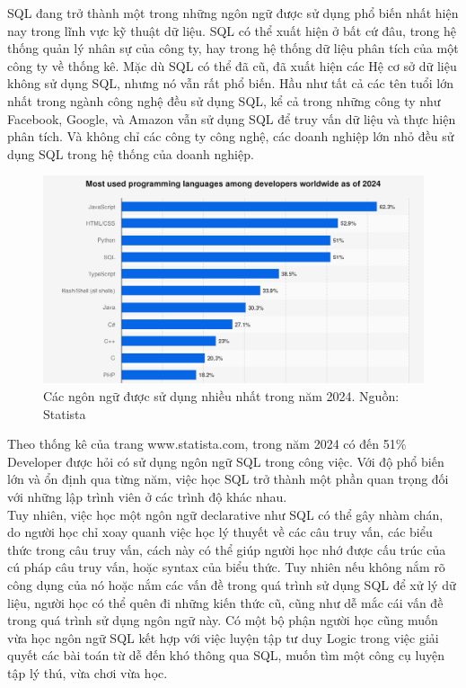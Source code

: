 \hspace*{0.5cm}SQL đang trở thành một trong những ngôn ngữ được sử dụng phổ biến nhất hiện nay trong lĩnh vực kỹ thuật dữ liệu. SQL có thể xuất hiện ở bất cứ đâu, trong hệ thống quản lý nhân sự của công ty, hay trong hệ thống dữ liệu phân tích của một công ty về thống kê. Mặc dù SQL có thể đã cũ, đã xuất hiện các Hệ cơ sở dữ liệu không sử dụng SQL, nhưng nó vẫn rất phổ biến. Hầu như tất cả các tên tuổi lớn nhất trong ngành công nghệ đều sử dụng SQL, kể cả trong những công ty như Facebook, Google, và Amazon vẫn sử dụng SQL để truy vấn dữ liệu và thực hiện phân tích. Và không chỉ các công ty công nghệ, các doanh nghiệp lớn nhỏ đều sử dụng SQL trong hệ thống của doanh nghiệp.\\
\begin{figure}[H]
	\centering
	\includegraphics[width=\textwidth]{Images/StatsMostLanguage.png}
	\vspace{0.5cm}
	\caption{Các ngôn ngữ được sử dụng nhiều nhất trong năm 2024. Nguồn: Statista}
\end{figure}


\hspace*{0.5cm}Theo thống kê của trang www.statista.com, trong năm 2024 có đến 51\% Developer được hỏi có sử dụng ngôn ngữ SQL trong công việc. Với độ phổ biến lớn và ổn định qua từng năm, việc học SQL trở thành một phần quan trọng đối với những lập trình viên ở các trình độ khác nhau.\\
Tuy nhiên, việc học một ngôn ngữ declarative như SQL có thể gây nhàm chán, do người học chỉ xoay quanh việc học lý thuyết về các câu truy vấn, các biểu thức trong câu truy vấn, cách này có thể giúp người học nhớ được cấu trúc của cú pháp câu truy vấn, hoặc syntax của biểu thức. Tuy nhiên nếu không nắm rõ công dụng của nó hoặc nắm các vấn đề trong quá trình sử dụng SQL để xử lý dữ liệu, người học có thể quên đi những kiến thức cũ, cũng như dễ mắc cái vấn đề trong quá trình sử dụng ngôn ngữ này. Có một bộ phận người học cũng muốn vừa học ngôn ngữ SQL kết hợp với việc luyện tập tư duy Logic trong việc giải quyết các bài toán từ dễ đến khó thông qua SQL, muốn tìm một công cụ luyện tập lý thú, vừa chơi vừa học.\\

